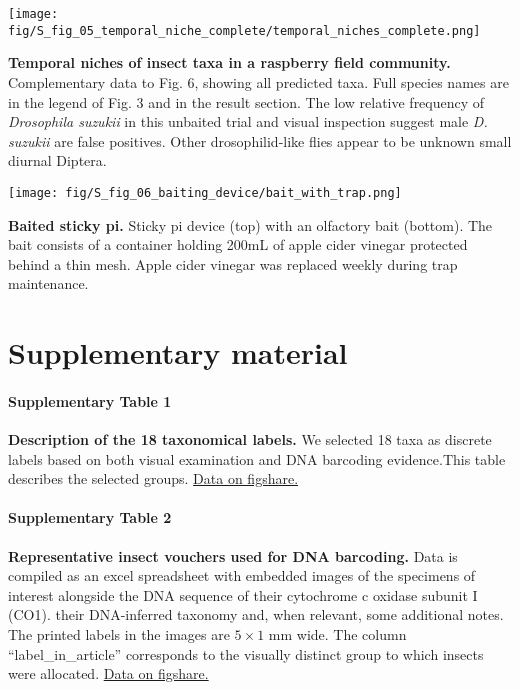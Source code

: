 \documentclass[fleqn,10pt]{wlscirep}
\begin{document}
\begin{supfig}[ht]
	\centering
	\texttt{[image: fig/S\_fig\_05\_temporal\_niche\_complete/temporal\_niches\_complete.png]}
	\caption{\textbf{Temporal niches of insect taxa in a raspberry field community.} Complementary data to Fig. 6, showing all predicted taxa. Full species names are in the legend of Fig. 3 and in the result section. The low relative frequency of \emph{Drosophila suzukii} in this unbaited trial and visual inspection suggest male \emph{D. suzukii} are false positives. Other drosophilid-like flies appear to be unknown small diurnal Diptera.}
	\label{supfig:04}
\end{supfig}

\pagebreak

\begin{supfig}[ht]
	\centering
	\texttt{[image: fig/S\_fig\_06\_baiting\_device/bait\_with\_trap.png]}
	\caption{\textbf{Baited sticky pi.} Sticky pi device (top) with an olfactory bait (bottom). The bait consists of a container holding 200mL of apple cider vinegar protected behind a thin mesh. Apple cider vinegar was replaced weekly during trap maintenance.}
	\label{supfig:05}
\end{supfig}


\clearpage
\newpage
\section*{Supplementary material}

\paragraph*{Supplementary Table 1}
\textbf{Description of the 18 taxonomical labels.} We selected 18 taxa as discrete labels based on both visual examination and DNA barcoding evidence.This table describes the selected groups.
\href{https://figshare.com/s/999a3b7a3c23a050b106}{Data on figshare.}

\paragraph*{Supplementary Table 2}
\textbf{Representative insect vouchers used for DNA barcoding.} 
Data is compiled as an excel spreadsheet with embedded images of the specimens of interest alongside the DNA sequence of their cytochrome c oxidase subunit I (CO1). their DNA-inferred taxonomy and, when relevant, some additional notes. 
The printed labels in the images are $5 \times{} 1$ mm wide. The column “label\_in\_article” corresponds to the visually distinct group to which insects were allocated.
\href{https://figshare.com/s/bdb7bef8c26065e3dd17}{Data on figshare.}
\end{document}
